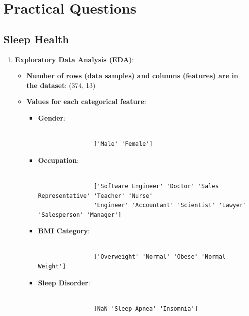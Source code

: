 \documentclass{article}
\begin{document}
\section*{Practical Questions}

\subsection*{Sleep Health}
\begin{enumerate}
    \item \textbf{Exploratory Data Analysis (EDA)}:
    
    \begin{itemize}

        \item \textbf{Number of rows (data samples) and columns (features) are in the dataset}: (374, 13)
     
        \item \textbf{Values for each categorical feature}:
        \begin{itemize}

            \item \textbf{Gender}:
            \begin{verbatim}

                ['Male' 'Female']

            \end{verbatim}

            \item \textbf{Occupation}:
            \begin{verbatim}

                ['Software Engineer' 'Doctor' 'Sales Representative' 'Teacher' 'Nurse'
                'Engineer' 'Accountant' 'Scientist' 'Lawyer' 'Salesperson' 'Manager']

            \end{verbatim}

            \item \textbf{BMI Category}:
            \begin{verbatim}

                ['Overweight' 'Normal' 'Obese' 'Normal Weight']

            \end{verbatim}

            \item \textbf{Sleep Disorder}:
            \begin{verbatim}

                [NaN 'Sleep Apnea' 'Insomnia']


\end{verbatim}
\end{itemize}
\end{itemize}
\end{enumerate}
\end{document}
